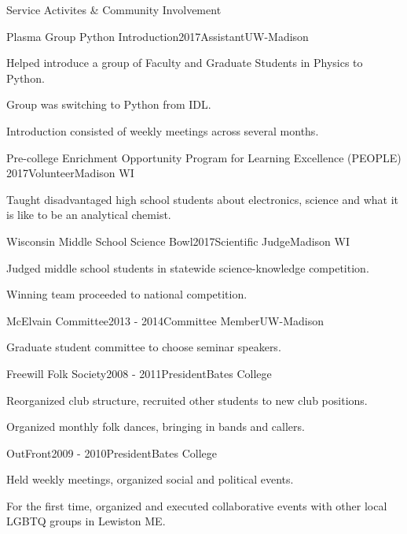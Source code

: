 \documentclass{resume}  %
\begin{document}
\begin{rSection}{Service Activites \& Community Involvement}
  \begin{rSubsection}{Plasma Group Python Introduction}{2017}{Assistant}{UW-Madison}
    \item Helped introduce a group of Faculty and Graduate Students in Physics to Python.
    \item Group was switching to Python from IDL.
    \item Introduction consisted of weekly meetings across several months.
  \end{rSubsection}
  \begin{rSubsection}{Pre-college Enrichment Opportunity Program for Learning Excellence (PEOPLE)}
    {2017}{Volunteer}{Madison WI}
	  \item Taught disadvantaged high school students about electronics, science and what it is like
      to be an analytical chemist.
  \end{rSubsection}
  \begin{rSubsection}{Wisconsin Middle School Science Bowl}{2017}{Scientific Judge}{Madison WI}
    \item Judged middle school students in statewide science-knowledge competition.
    \item Winning team proceeded to national competition.
  \end{rSubsection}
  \begin{rSubsection}{McElvain Committee}{2013 - 2014}{Committee Member}{UW-Madison}
    \item Graduate student committee to choose seminar speakers.
  \end{rSubsection}
  \begin{rSubsection}{Freewill Folk Society}{2008 - 2011}{President}{Bates College}
    \item Reorganized club structure, recruited other students to new club positions.
    \item Organized monthly folk dances, bringing in bands and callers.
  \end{rSubsection}
  \begin{rSubsection}{OutFront}{2009 - 2010}{President}{Bates College}
    \item Held weekly meetings, organized social and political events.
    \item For the first time, organized and executed collaborative events with other local LGBTQ
      groups in Lewiston ME.
  \end{rSubsection}
\end{rSection}
\end{document}
